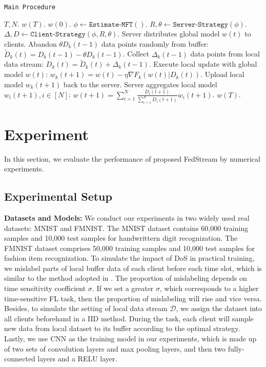 \documentclass{article}
\theoremstyle{plain}
\theoremstyle{definition}
\theoremstyle{remark}
\begin{document}
 \begin{algorithm}
    \caption{\texttt{Main Procedure}}
    \begin{algorithmic}[1]
         $T, N$.
         $w(T)$.
         $w(0)$.
        \STATE $\phi \gets \texttt{Estimate-MFT}()$.
        \STATE $R, \theta \gets \texttt{Server-Strategy}(\phi)$.
        \STATE $\Delta, D \gets \texttt{Client-Strategy}(\phi, R, \theta)$.
            \STATE Server distributes global model $w(t)$ to clients.
                \STATE Abandon $\theta D_k(t-1)$ data points randomly from buffer: $\widetilde{D}_k(t) = D_k(t-1) - \theta D_k(t-1)$.
                \STATE Collect $\Delta_k(t-1)$ data points from local data stream: $D_k(t) = \widetilde{D}_k(t) + \Delta_k(t-1)$.
                \STATE Execute local update with global model $w(t)$: $w_k(t+1) = w(t) - \eta \nabla F_k(w(t)|D_k(t))$. 
                \STATE Upload local model $w_k(t+1)$ back to the server.
            \ENDFOR
            \STATE Server aggregates local model $w_i(t+1), i \in [N]$: $w(t+1) = \sum_{i=1}^{N} \frac{D_i(t+1)}{\sum_{i=1}^{N}D_i(t+1)} w_i(t+1)$.
        \ENDFOR
         $w(T)$.
    \end{algorithmic}
 \end{algorithm}

\section{Experiment}
In this section, we evaluate the performance of proposed FedStream by numerical experiments.
\subsection{Experimental Setup}
\textbf{Datasets and Models: }
We conduct our experiments in two widely used real datasets: MNIST and FMNIST.
The MNIST dataset contains 60,000 training samples and 10,000 test samples for handwrittern digit recognization.
The FMNIST dataset comprises 50,000 training samples and 10,000 test samples for fashion item recognization.
To simulate the impact of DoS in practical training, we mislabel parts of local buffer data of each client before each time slot, which is similar to the method adopted in \cite{xu2024age}. 
The proportion of mislabeling depends on time sensitivity coefficient $\sigma$. If we set a greater $\sigma$, which corresponds to a higher time-sensitive FL task, then the proportion of mislabeling will rise and vice versa.
Besides, to simulate the setting of local data stream $\mathcal{D}$, we assign the dataset into all clients beforehand in a IID method. During the task, each client will sample new data from local dataset to its buffer according to the optimal strategy.
Lastly, we use CNN as the training model in our experiments, which is made up of two sets of convolution layers and max pooling layers, and then two fully-connected layers and a RELU layer.
\end{document}
